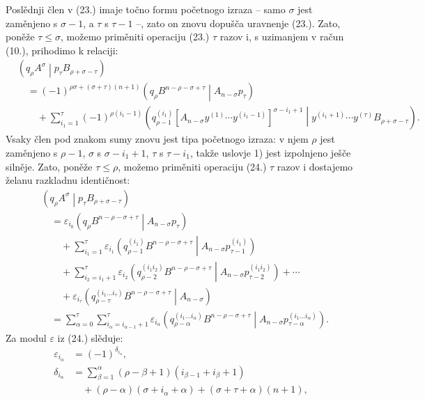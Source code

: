 \documentclass[11pt]{article}
\newcommand{\pair}[2]{\left(#1\middle|#2\right)}
\newcommand{\eps}{\varepsilon}
\begin{document}
Poslědnji člen v (23.) imaje točno formu početnogo izraza -- samo $\sigma$ jest zaměnjeno s $\sigma-1$, a $\tau$ s $\tau-1$ --, zato on znovu dopušča uravnenje (23.). Zato, poněže $\tau\le\sigma$, možemo priměniti operaciju (23.) $\tau$ razov i, s uzimanjem v račun (10.), prihodimo k relaciji:
\begin{equation}
\begin{aligned}
&\pair{q_\rho A^\sigma}{p_\tau B_{\rho+\sigma-\tau}}\\
&\quad=(-1)^{\rho\sigma+(\sigma+\tau)(n+1)}
\pair{q_\rho B^{n-\rho-\sigma+\tau}}{A_{n-\sigma}p_\tau}\\
&\qquad+\sum_{i_1=1}^{\tau}(-1)^{\rho(i_1-1)}
\pair{q_{\rho-1}^{(i_1)}
[A_{n-\sigma}y^{(1)}\cdots y^{(i_1-1)}]^{\sigma-i_1+1}}
{y^{(i_1+1)}\cdots y^{(\tau)}B_{\rho+\sigma-\tau}}.
\end{aligned}
\tag{24}
\end{equation}
Vsaky člen pod znakom sumy znovu jest tipa početnogo izraza: v njem $\rho$ jest zaměnjeno s $\rho-1$, $\sigma$ s $\sigma-i_1+1$, $\tau$ s $\tau-i_1$, takže uslovje 1) jest izpolnjeno ješče silněje. Zato, poněže $\tau\le\rho$, možemo priměniti operaciju (24.) $\tau$ razov i dostajemo želanu razkladnu identičnost:
\begin{equation}
\begin{aligned}
&\pair{q_\rho A^\sigma}{p_\tau B_{\rho+\sigma-\tau}}\\
&\quad=\eps_{i_0}\pair{q_\rho B^{n-\rho-\sigma+\tau}}
{A_{n-\sigma}p_\tau}\\
&\qquad+\sum_{i_1=1}^{\tau}\eps_{i_1}
\pair{q_{\rho-1}^{(i_1)}B^{n-\rho-\sigma+\tau}}
{A_{n-\sigma}p_{\tau-1}^{(i_1)}}\\
&\qquad+\sum_{i_2=i_1+1}^{\tau}\eps_{i_2}
\pair{q_{\rho-2}^{(i_1i_2)}B^{n-\rho-\sigma+\tau}}
{A_{n-\sigma}p_{\tau-2}^{(i_1i_2)}}+\cdots\\
&\qquad+\eps_{i_\tau}
\pair{q_{\rho-\tau}^{(i_1\ldots i_\tau)}B^{n-\rho-\sigma+\tau}}
{A_{n-\sigma}}\\
&\quad=\sum_{\alpha=0}^{\tau}
\sum_{i_\alpha=i_{\alpha-1}+1}^{\tau}\eps_{i_\alpha}
\pair{q_{\rho-\alpha}^{(i_1\ldots i_\alpha)}B^{n-\rho-\sigma+\tau}}
{A_{n-\sigma}p_{\tau-\alpha}^{(i_1\ldots i_\alpha)}}.
\end{aligned}
\tag{25}
\end{equation}
Za modul $\eps$ iz (24.) slěduje:
\begin{equation}
\begin{aligned}
\eps_{i_\alpha}&=(-1)^{\delta_{i_\alpha}},\\
\delta_{i_\alpha}
&=\sum_{\beta=1}^{\alpha}(\rho-\beta+1)(i_{\beta-1}+i_\beta+1)\\
&\quad+(\rho-\alpha)(\sigma+i_\alpha+\alpha)
+(\sigma+\tau+\alpha)(n+1),
\end{aligned}
\tag{26}
\end{equation}
\end{document}
